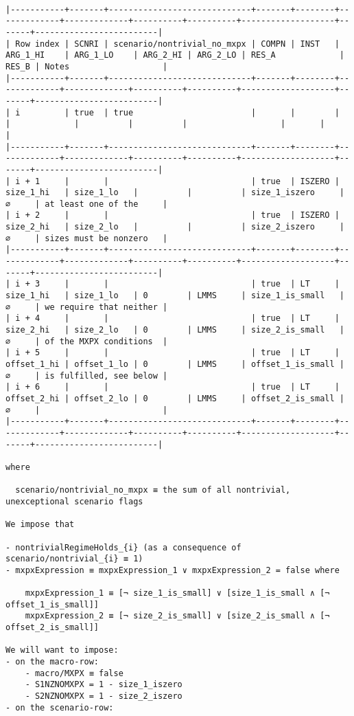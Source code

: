 \documentclass[varwidth=\maxdimen,margin=0.5cm,multi={verbatim}]{standalone}
\begin{document}
\begin{verbatim}

|-----------+-------+-----------------------------+-------+--------+-------------+-------------+----------+----------+-------------------+-------+-------------------------|
| Row index | SCNRI | scenario/nontrivial_no_mxpx | COMPN | INST   | ARG_1_HI    | ARG_1_LO    | ARG_2_HI | ARG_2_LO | RES_A             | RES_B | Notes                   |
|-----------+-------+-----------------------------+-------+--------+-------------+-------------+----------+----------+-------------------+-------+-------------------------|
| i         | true  | true                        |       |        |             |             |          |          |                   |       |                         |
|-----------+-------+-----------------------------+-------+--------+-------------+-------------+----------+----------+-------------------+-------+-------------------------|
| i + 1     |       |                             | true  | ISZERO | size_1_hi   | size_1_lo   |          |          | size_1_iszero     | ∅     | at least one of the     |
| i + 2     |       |                             | true  | ISZERO | size_2_hi   | size_2_lo   |          |          | size_2_iszero     | ∅     | sizes must be nonzero   |
|-----------+-------+-----------------------------+-------+--------+-------------+-------------+----------+----------+-------------------+-------+-------------------------|
| i + 3     |       |                             | true  | LT     | size_1_hi   | size_1_lo   | 0        | LMMS     | size_1_is_small   | ∅     | we require that neither |
| i + 4     |       |                             | true  | LT     | size_2_hi   | size_2_lo   | 0        | LMMS     | size_2_is_small   | ∅     | of the MXPX conditions  |
| i + 5     |       |                             | true  | LT     | offset_1_hi | offset_1_lo | 0        | LMMS     | offset_1_is_small | ∅     | is fulfilled, see below |
| i + 6     |       |                             | true  | LT     | offset_2_hi | offset_2_lo | 0        | LMMS     | offset_2_is_small | ∅     |                         |
|-----------+-------+-----------------------------+-------+--------+-------------+-------------+----------+----------+-------------------+-------+-------------------------|

where 

  scenario/nontrivial_no_mxpx ≡ the sum of all nontrivial, unexceptional scenario flags

We impose that

- nontrivialRegimeHolds_{i} (as a consequence of scenario/nontrivial_{i} ≡ 1)
- mxpxExpression ≡ mxpxExpression_1 ∨ mxpxExpression_2 = false where

	mxpxExpression_1 ≡ [¬ size_1_is_small] ∨ [size_1_is_small ∧ [¬ offset_1_is_small]]
	mxpxExpression_2 ≡ [¬ size_2_is_small] ∨ [size_2_is_small ∧ [¬ offset_2_is_small]]

We will want to impose:
- on the macro-row:
	- macro/MXPX ≡ false
	- S1NZNOMXPX = 1 - size_1_iszero
	- S2NZNOMXPX = 1 - size_2_iszero
- on the scenario-row:

\end{verbatim}
\end{document}
